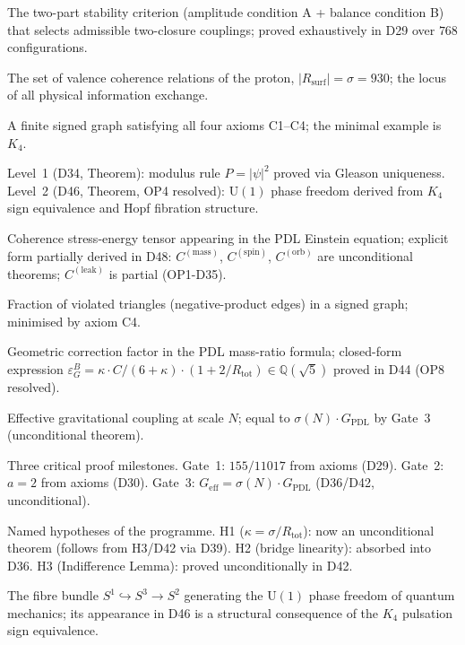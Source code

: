 \documentclass[11pt,a4paper]{article}
\theoremstyle{plain}
\theoremstyle{definition}
\theoremstyle{remark}
\newcommand{\Geff}{G_{\mathrm{eff}}}
\newcommand{\GPDL}{G_{\mathrm{PDL}}}
\newcommand{\Rsurf}{R_{\mathrm{surf}}}
\newcommand{\Rtot}{R_{\mathrm{tot}}}
\newcommand{\sigmaN}{\sigma(N)}
\newcommand{\epsGeomB}{\varepsilon_G^B}
\newcommand{\Ccoh}{C_{\mathrm{coh}}}
\begin{document}
\begin{description}[leftmargin=3.5cm, style=nextline]
\item[AB criterion] The two-part stability criterion (amplitude condition A + balance condition B) that selects admissible two-closure couplings; proved exhaustively in D29 over $768$ configurations.
\item[Active surface $\Rsurf$] The set of valence coherence relations of the proton, $|\Rsurf|=\sigma=930$; the locus of all physical information exchange.
\item[Admissible closure] A finite signed graph satisfying all four axioms C1--C4; the minimal example is $K_4$.
\item[Born Level~1 / Level~2] Level~1 (D34, Theorem): modulus rule $P=|\psi|^2$ proved via Gleason uniqueness. Level~2 (D46, Theorem, OP4 resolved): $\mathrm{U}(1)$ phase freedom derived from $K_4$ sign equivalence and Hopf fibration structure.
\item[$\Ccoh$] Coherence stress-energy tensor appearing in the PDL Einstein equation; explicit form partially derived in D48: $C^{(\mathrm{mass})}$, $C^{(\mathrm{spin})}$, $C^{(\mathrm{orb})}$ are unconditional theorems; $C^{(\mathrm{leak})}$ is partial (OP1-D35).
\item[Coherence cost] Fraction of violated triangles (negative-product edges) in a signed graph; minimised by axiom C4.
\item[$\epsGeomB$] Geometric correction factor in the PDL mass-ratio formula; closed-form expression $\epsGeomB = \kappa \cdot C/(6+\kappa)\cdot(1+2/\Rtot) \in \mathbb{Q}(\sqrt{5})$ proved in D44 (OP8 resolved).
\item[$\Geff(N)$] Effective gravitational coupling at scale $N$; equal to $\sigmaN\cdot\GPDL$ by Gate~3 (unconditional theorem).
\item[Gate 1, 2, 3] Three critical proof milestones. Gate~1: $155/11017$ from axioms (D29). Gate~2: $a=2$ from axioms (D30). Gate~3: $\Geff=\sigmaN\cdot\GPDL$ (D36/D42, unconditional).
\item[H1, H2, H3] Named hypotheses of the programme. H1 ($\kappa=\sigma/R_{\mathrm{tot}}$): now an unconditional theorem (follows from H3/D42 via D39). H2 (bridge linearity): absorbed into D36. H3 (Indifference Lemma): proved unconditionally in D42.
\item[Hopf fibration] The fibre bundle $S^1\hookrightarrow S^3\to S^2$ generating the $\mathrm{U}(1)$ phase freedom of quantum mechanics; its appearance in D46 is a structural consequence of the $K_4$ pulsation sign equivalence.

\end{description}
\end{document}
